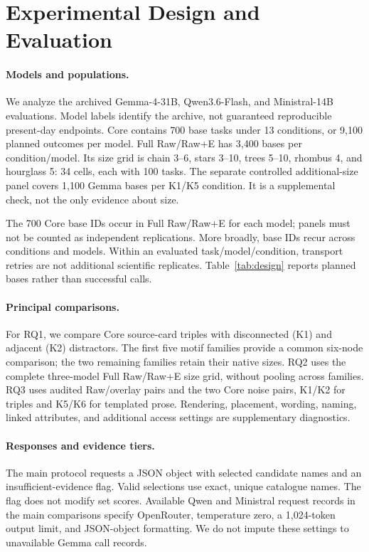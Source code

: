 \section{Experimental Design and Evaluation}
\label{sec:setup}
\paragraph{Models and populations.}
We analyze the archived Gemma-4-31B, Qwen3.6-Flash, and Ministral-14B evaluations. Model labels identify the archive, not guaranteed reproducible present-day endpoints. Core contains 700 base tasks under 13 conditions, or 9,100 planned outcomes per model. Full Raw/Raw+E has 3,400 bases per condition/model. Its size grid is chain 3--6, stars 3--10, trees 5--10, rhombus 4, and hourglass 5: 34 cells, each with 100 tasks. The separate controlled additional-size panel covers 1,100 Gemma bases per K1/K5 condition. It is a supplemental check, not the only evidence about size.

The 700 Core base IDs occur in Full Raw/Raw+E for each model; panels must not be counted as independent replications. More broadly, base IDs recur across conditions and models. Within an evaluated task/model/condition, transport retries are not additional scientific replicates. Table~\ref{tab:design} reports planned bases rather than successful calls.

\paragraph{Principal comparisons.}
For RQ1, we compare Core source-card triples with disconnected (K1) and adjacent (K2) distractors. The first five motif families provide a common six-node comparison; the two remaining families retain their native sizes. RQ2 uses the complete three-model Full Raw/Raw+E size grid, without pooling across families. RQ3 uses audited Raw/overlay pairs and the two Core noise pairs, K1/K2 for triples and K5/K6 for templated prose. Rendering, placement, wording, naming, linked attributes, and additional access settings are supplementary diagnostics.

\paragraph{Responses and evidence tiers.}
The main protocol requests a JSON object with selected candidate names and an insufficient-evidence flag. Valid selections use exact, unique catalogue names. The flag does not modify set scores. Available Qwen and Ministral request records in the main comparisons specify OpenRouter, temperature zero, a 1,024-token output limit, and JSON-object formatting. We do not impute these settings to unavailable Gemma call records.

